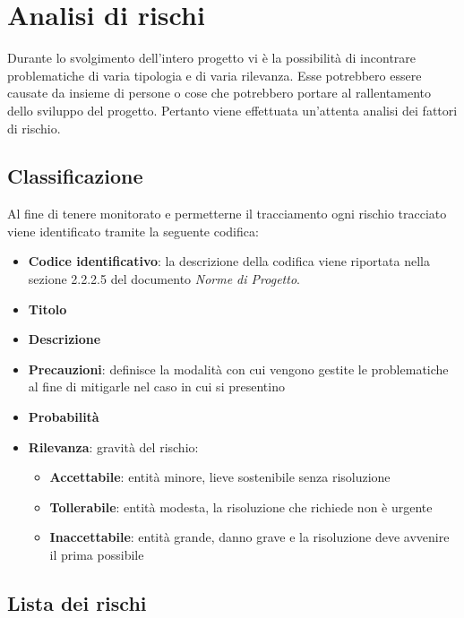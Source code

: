 \section{Analisi di rischi}

Durante lo svolgimento dell’intero progetto vi è la possibilità di incontrare problematiche di varia tipologia e di varia rilevanza. 
Esse potrebbero essere causate da insieme di persone o cose che potrebbero portare al rallentamento dello sviluppo del progetto. 
Pertanto viene effettuata un'attenta analisi dei fattori di rischio. 

\subsection{Classificazione}
Al fine di tenere monitorato e permetterne il tracciamento ogni  rischio tracciato viene identificato tramite la seguente codifica:
\begin{itemize}
    \item \textbf{Codice identificativo}: la descrizione della codifica viene riportata nella sezione 2.2.2.5 del documento \textit{Norme di Progetto}.
    \item \textbf{Titolo}
    \item \textbf{Descrizione}
    \item \textbf{Precauzioni}: definisce la modalità con cui vengono gestite le problematiche al fine di mitigarle nel caso in cui si presentino
    \item \textbf{Probabilità}
    \item \textbf{Rilevanza}: gravità del rischio:
    \begin{itemize}
        \item \textbf{Accettabile}: entità minore, lieve sostenibile senza risoluzione
        \item \textbf{Tollerabile}: entità modesta, la risoluzione che richiede non è urgente
        \item \textbf{Inaccettabile}: entità grande, danno grave e la risoluzione deve avvenire il prima possibile
    \end{itemize}
\end{itemize}

\subsection{Lista dei rischi}

